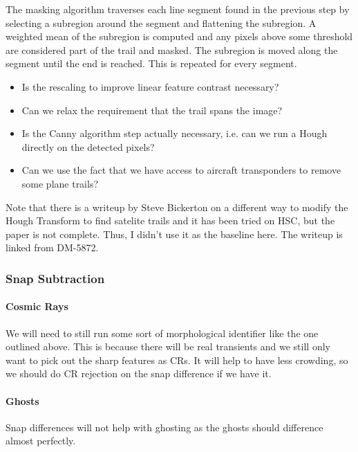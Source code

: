 The masking algorithm traverses each line segment found in the previous step by selecting a subregion around the segment and flattening the subregion.  A weighted mean of the subregion is computed and any pixels above some threshold are considered part of the trail and masked.  The subregion is moved along the segment until the end is reached.  This is repeated for every segment.

\begin{note}
\begin{itemize}
\item Is the rescaling to improve linear feature contrast necessary?
\item Can we relax the requirement that the trail spans the image?
\item Is the Canny algorithm step actually necessary, i.e. can we run a Hough directly on the detected pixels?
\item Can we use the fact that we have access to aircraft transponders to remove some plane trails?
\end{itemize}
\end{note}

\begin{note}
Note that there is a writeup by Steve Bickerton on a different way to modify the Hough Transform to find satelite trails and it has been tried on HSC, but the paper is not complete.  Thus, I didn't use it as the baseline here.  The writeup is linked from DM-5872.
\end{note}

\subsubsection{Snap Subtraction}
\label{sec:acSnapSubtraction}
\paragraph{Cosmic Rays}
We will need to still run some sort of morphological identifier like the one outlined above.  This is because there will be real transients and we still only want to pick out the sharp features as CRs.  It will help to have less crowding, so we should do CR rejection on the snap difference if we have it.

\paragraph{Ghosts}
Snap differences will not help with ghosting as the ghosts should difference almost perfectly.

